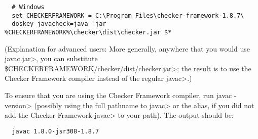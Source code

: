 \begin{itemize}
\begin{Verbatim}
  # Windows
  set CHECKERFRAMEWORK = C:\Program Files\checker-framework-1.8.7\
  doskey javacheck=java -jar %CHECKERFRAMEWORK%\checker\dist\checker.jar $*
\end{Verbatim}

   (Explanation for advanced users:  More generally, anywhere that you would use \<javac.jar>, you can substitute
   \<\$CHECKERFRAMEWORK/checker/dist/checker.jar>; 
   the result is to use the Checker
   Framework compiler instead of the regular \<javac>.)

\end{itemize}


To ensure that you are using the Checker Framework compiler, run
\<javac -version> (possibly using the
full pathname to \<javac> or the alias, if you did not add the Checker
Framework \<javac> to your path).
The output should be:

\begin{Verbatim}
  javac 1.8.0-jsr308-1.8.7
\end{Verbatim}




